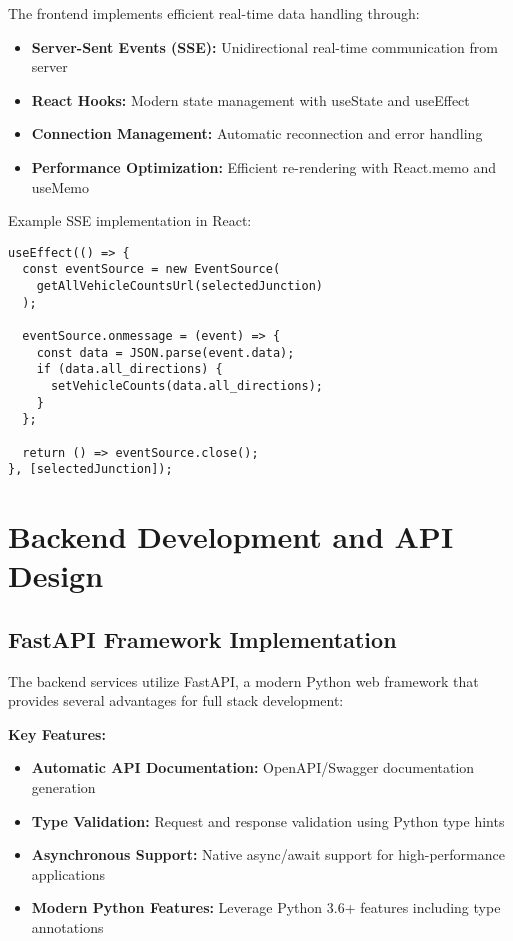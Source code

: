 \documentclass[conference]{IEEEtran}
\begin{document}
The frontend implements efficient real-time data handling through:
\begin{itemize}
\item \textbf{Server-Sent Events (SSE):} Unidirectional real-time communication from server
\item \textbf{React Hooks:} Modern state management with useState and useEffect
\item \textbf{Connection Management:} Automatic reconnection and error handling
\item \textbf{Performance Optimization:} Efficient re-rendering with React.memo and useMemo
\end{itemize}

Example SSE implementation in React:
\begin{verbatim}
useEffect(() => {
  const eventSource = new EventSource(
    getAllVehicleCountsUrl(selectedJunction)
  );
  
  eventSource.onmessage = (event) => {
    const data = JSON.parse(event.data);
    if (data.all_directions) {
      setVehicleCounts(data.all_directions);
    }
  };
  
  return () => eventSource.close();
}, [selectedJunction]);
\end{verbatim}

\section{Backend Development and API Design}

\subsection{FastAPI Framework Implementation}

The backend services utilize FastAPI, a modern Python web framework that provides several advantages for full stack development:

\textbf{Key Features:}
\begin{itemize}
\item \textbf{Automatic API Documentation:} OpenAPI/Swagger documentation generation
\item \textbf{Type Validation:} Request and response validation using Python type hints
\item \textbf{Asynchronous Support:} Native async/await support for high-performance applications
\item \textbf{Modern Python Features:} Leverage Python 3.6+ features including type annotations
\end{itemize}
\end{document}
